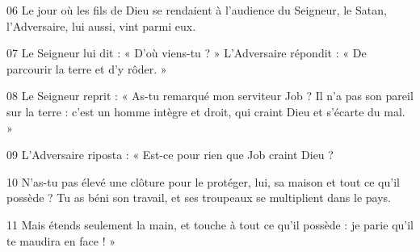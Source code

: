 
06 Le jour où les fils de Dieu se rendaient à l’audience du Seigneur, le Satan, l’Adversaire, lui aussi, vint parmi eux.

07 Le Seigneur lui dit : « D’où viens-tu ? » L’Adversaire répondit : « De parcourir la terre et d’y rôder. »

08 Le Seigneur reprit : « As-tu remarqué mon serviteur Job ? Il n’a pas son pareil sur la terre : c’est un homme intègre et droit, qui craint Dieu et s’écarte du mal. »

09 L’Adversaire riposta : « Est-ce pour rien que Job craint Dieu ?

10 N’as-tu pas élevé une clôture pour le protéger, lui, sa maison et tout ce qu’il possède ? Tu as béni son travail, et ses troupeaux se multiplient dans le pays.

11 Mais étends seulement la main, et touche à tout ce qu’il possède : je parie qu’il te maudira en face ! »